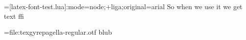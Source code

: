 \documentclass{article}
\begin{document}
\font\testluafont={[latex-font-test.lua]:mode=node;+liga;original=arial}
{\testluafont So when we use it we get text ffi}




\font\test={file:texgyrepagella-regular.otf} \test blub
\end{document}
